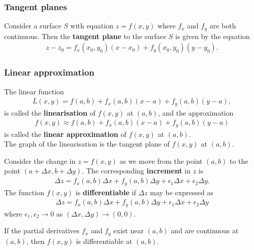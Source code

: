 \documentclass{article}
\begin{document}
\subsubsection{Tangent planes}

\begin{definition}
	Consider a surface $S$ with equation $z=f(x,y)$ where $f_x$ and $f_y$
	are both continuous. Then the \textbf{tangent plane} to the surface $S$
	is given by the equation
	\begin{align*}
		z - z_0 = f_x(x_0, y_0)(x-x_0) + f_y(x_0,y_0)(y-y_0).
	\end{align*}
\end{definition}

\subsubsection{Linear approximation}

\begin{definition}
	The linear function
	\begin{align*}
		L(x,y)=f(a,b)+f_x(a,b)(x-a)+f_y(a,b)(y-a),
	\end{align*}
	is called the \textbf{linearisation} of $f(x,y)$ at $(a,b)$, and the
	approximation
	\begin{align*}
		f(x,y)\approx f(a,b)+f_x(a,b)(x-a)+f_y(a,b)(y-a)
	\end{align*}
	is called the \textbf{linear approximation} of $f(x,y)$ at $(a,b)$.\\
	The graph of the linearisation is the tangent plane of $f(x,y)$ at
	$(a,b)$.
\end{definition}
\begin{definition}
	Consider the change in $z=f(x,y)$ as we move from the point
	$(a,b)$ to the point $(a+\Delta x, b+\Delta y)$. The
	corresponding \textbf{increment} in $z$ is
	\begin{align*}
		\Delta z = f_x(a,b)\Delta x + f_y(a,b)\Delta y
		+ \epsilon_1\Delta x + \epsilon_2\Delta y.
	\end{align*}
	The function $f(x,y)$ is \textbf{differentiable} if $\Delta z$
	may be expressed as
	\begin{align*}
		\Delta z = f_x(a,b)\Delta x + f_y(a,b)\Delta y
		+ \epsilon_1\Delta x + \epsilon_2\Delta y
	\end{align*}
	where $\epsilon_1, \epsilon_2 \to 0$ as
	$(\Delta x, \Delta y)\to(0,0)$.
\end{definition}
\begin{theorem}
	If the partial derivatives $f_x$ and $f_y$ exist near
	$(a,b)$ and are continuous at $(a,b)$, then $f(x,y)$
	is differentiable at $(a,b)$.
\end{theorem}
\end{document}
